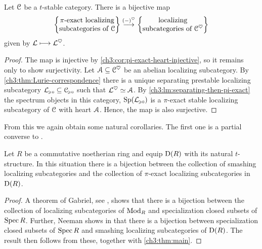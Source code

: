 \begin{theorem}
    \label{ch3:thm:main}
    Let $\EuScript{C}$ be a $t$-stable category. There is a bijective map
    \[\left\{ \begin{matrix} \pi\text{-exact localizing}\\ \text{subcategories of }\EuScript{C} \end{matrix} \right\}\overset{(-)^\heartsuit}{\longrightarrow} \left\{ \begin{matrix} \text{localizing}\\ \text{subcategories of }\EuScript{C}^\heartsuit \end{matrix} \right\}\]
    given by $\mathcal{L}\longmapsto \mathcal{L}^\heartsuit$. 
\end{theorem}
\begin{proof}
    The map is injective by \cref{ch3:cor:pi-exact-heart-injective}, so it remains only to show surjectivity. Let $\EuScript{A}\subseteq \EuScript{C}^\heartsuit$ be an abelian localizing subcategory. By \cref{ch3:thm:Lurie-correspondence} there is a unique separating prestable localizing subcategory $\mathcal{L}_{\hspace{-1pt}\scriptscriptstyle\geqslant 0} \subseteq \EuScript{C}_{\hspace{-1pt}\scriptscriptstyle\geqslant 0}$ such that $\mathcal{L}^\heartsuit \simeq \EuScript{A}$. By \cref{ch3:lm:separating-then-pi-exact} the spectrum objects in this category, $\mathrm{Sp}(\mathcal{L}_{\hspace{-1pt}\scriptscriptstyle\geqslant 0})$ is a $\pi$-exact stable localizing subcategory of $\EuScript{C}$ with heart $\EuScript{A}$. Hence, the map is also surjective. 
\end{proof}


From this we again obtain some natural corollaries. The first one is a partial converse to \cite[2.13]{takahashi_2009}.

\begin{corollary}
    \label{ch3:cor:smashing-pi-exact}
    Let $R$ be a commutative noetherian ring and equip $\mathrm{D}(R)$ with its natural $t$-structure. In this situation there is a bijection between the collection of smashing localizing subcategories and the collection of $\pi$-exact localizing subcategories in $\mathrm{D}(R)$. 
\end{corollary}
\begin{proof}
    A theorem of Gabriel, see \cite[VI.2.4(b)]{gabriel_1962}, shows that there is a bijection between the collection of localizing subcategories of $\mathrm{Mod}_R$ and specialization closed subsets of $\operatorname{Spec} R$. Further, Neeman shows in \cite[3.3]{neeman_1992} that there is a bijection between specialization closed subsets of $\operatorname{Spec} R$ and smashing localizing subcategories of $\mathrm{D}(R)$. The result then follows from these, together with \cref{ch3:thm:main}. 
\end{proof}

